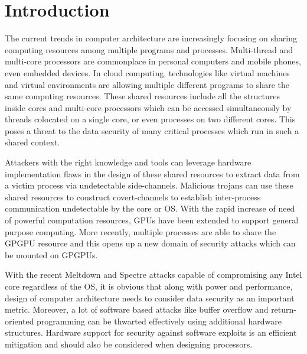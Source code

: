 
\chapter{Introduction}


The current trends in computer architecture are increasingly focusing on sharing
computing resources among multiple programs and processes. Multi-thread and multi-core
processors are commonplace in personal computers and mobile phones, even embedded devices.
In cloud computing, technologies like virtual machines and virtual environments are
allowing multiple different programs to share the same computing resources.
These shared resources include all the structures inside cores and multi-core processors
which can be accessed simultaneously by threads colocated on a single core, or even processes
on two different cores. This poses a threat to the data security of many critical
processes which run in such a shared context.

Attackers with the right knowledge and tools
can leverage hardware implementation flaws in the design of these shared resources
to extract data from a victim process via undetectable side-channels. Malicious trojans
can use these shared resources to construct covert-channels to establish inter-process
communication undetectable by the core or OS. With the rapid increase of need of
powerful computation resources, GPUs have been extended to support general purpose computing.
More recently, multiple processes are able to share the GPGPU resource
and this opens up a new domain of security attacks which can be mounted on GPGPUs.

With the recent Meltdown  and Spectre  attacks capable of compromising any Intel core 
regardless of the OS, it is obvious that along with power and performance, design of
computer architecture needs to consider data security as an important metric.
Moreover, a lot of software based attacks like buffer overflow and return-oriented
programming can be thwarted effectively using additional hardware structures.
Hardware support for security against software exploits is an efficient mitigation
and should also be considered when designing processors.\\
\\

